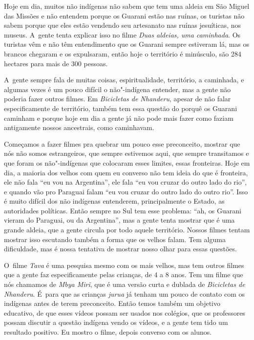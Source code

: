 Hoje em dia, muitos não indígenas não sabem que tem uma aldeia em São
Miguel das Missões e não entendem porque os Guarani estão nas ruínas,
os turistas não sabem porque que eles estão vendendo seu artesanato nas
ruínas jesuíticas, nos museus. A~gente tenta explicar isso no filme
\emph{Duas aldeias, uma caminhada}. Os turistas vêm e não têm entendimento que
os Guarani sempre estiveram lá, mas os brancos chegaram e os
expulsaram, então hoje o território é minúsculo, são 284 hectares para
mais de 300 pessoas.

A~gente sempre fala de muitas coisas, espiritualidade, território, a
caminhada, e algumas vezes é um pouco difícil o não"-indígena entender,
mas a gente não poderia fazer outros filmes. Em \emph{Bicicletas de Nhanderu},
apesar de não falar especificamente de território, também tem essa
questão do porquê os Guarani caminham e porque hoje em dia a gente já
não pode mais fazer como faziam antigamente nossos ancestrais, como
caminhavam.

Começamos a fazer filmes pra quebrar um pouco esse preconceito, mostrar
que nós não somos estrangeiros, que sempre estivemos aqui, que sempre
transitamos e que foram os não"-indígenas que colocaram esses limites,
essas fronteiras. Hoje em dia, a maioria dos velhos com quem eu
converso não tem ideia do que é fronteira, ele não fala ``eu vou na
Argentina'', ele fala ``eu vou cruzar do outro lado do rio'', e quando vão
pro Paraguai falam ``eu vou cruzar do outro lado do outro rio''. Isso é
muito difícil dos não indígenas entenderem, principalmente o Estado, as
autoridades políticas. Então sempre no Sul tem esse problema: ``ah, os
Guarani vieram do Paraguai, ou da Argentina'', mas a gente tenta mostrar
que é uma grande aldeia, que a gente circula por todo aquele
território. Nossos filmes tentam mostrar isso escutando também a forma
que os velhos falam. Tem alguma dificuldade, mas é nossa tentativa de
mostrar nosso olhar para essas questões.

O~filme \emph{Tava} é uma pesquisa mesmo com os mais velhos, mas tem outros
filmes que a gente faz especificamente pelas crianças, de 4 a 8 anos.
Tem um filme que nós chamamos de \emph{Mbya Mirĩ}, que é uma
versão curta e dublada de \emph{Bicicletas de Nhanderu}. É~para que as
crianças \emph{jurua} já tenham um pouco de contato com os indígenas antes de
terem preconceito. Então temos também um objetivo educativo, de que
esses vídeos possam ser usados nos colégios, que os professores possam
discutir a questão indígena vendo os vídeos, e a gente tem tido um
resultado positivo. Eu mostro o filme, depois converso com os alunos. 

